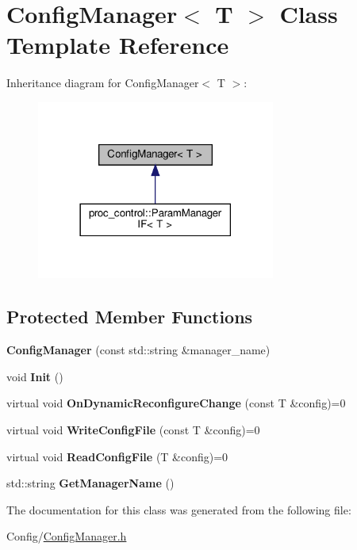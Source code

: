 \hypertarget{class_config_manager}{}\section{Config\+Manager$<$ T $>$ Class Template Reference}
\label{class_config_manager}


Inheritance diagram for Config\+Manager$<$ T $>$\+:\nopagebreak
\begin{figure}[H]
\begin{center}
\leavevmode
\includegraphics[width=222pt]{class_config_manager__inherit__graph}
\end{center}
\end{figure}
\subsection*{Protected Member Functions}
\begin{DoxyCompactItemize}
\item 
\mbox{\label{class_config_manager_a1237cc0ba9d19c05c5d284b28742b87a}} 
{\bfseries Config\+Manager} (const std\+::string \&manager\+\_\+name)
\item 
\mbox{\label{class_config_manager_a3fff642da4bd73a5d64bb90e8ae85915}} 
void {\bfseries Init} ()
\item 
\mbox{\label{class_config_manager_a6256f5de4d8f6e6c7a9d62f97926601d}} 
virtual void {\bfseries On\+Dynamic\+Reconfigure\+Change} (const T \&config)=0
\item 
\mbox{\label{class_config_manager_a4dfc5e51faba689ec20bf9f8d994c135}} 
virtual void {\bfseries Write\+Config\+File} (const T \&config)=0
\item 
\mbox{\label{class_config_manager_af7302a9dd1d428cd6a2a365ddedf35ee}} 
virtual void {\bfseries Read\+Config\+File} (T \&config)=0
\item 
\mbox{\label{class_config_manager_ace20b48c9921f9771e5203e164b58b1b}} 
std\+::string {\bfseries Get\+Manager\+Name} ()
\end{DoxyCompactItemize}


The documentation for this class was generated from the following file\+:\begin{DoxyCompactItemize}
\item 
Config/\hyperlink{_config_manager_8h}{Config\+Manager.\+h}\end{DoxyCompactItemize}
